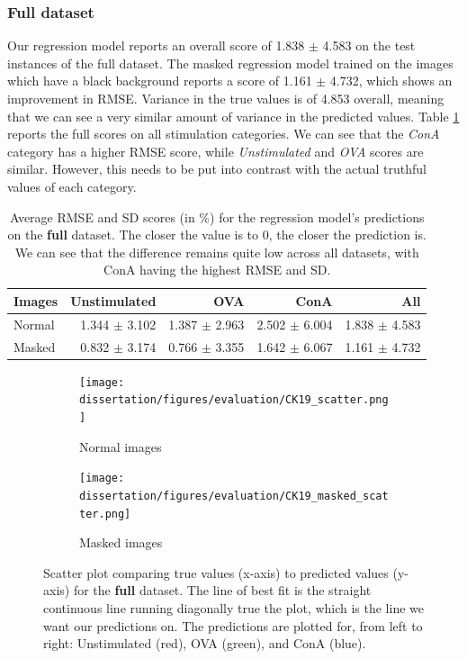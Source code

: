 \bigskip
\subsubsection{Full dataset}
\hfill
\hfill

Our regression model reports an overall score of 1.838 $\pm$ 4.583 on the test instances of the full dataset. The masked regression model trained on the images which have a black background reports a score of 1.161 $\pm$ 4.732, which shows an improvement in RMSE. Variance in the true values is of 4.853 overall, meaning that we can see a very similar amount of variance in the predicted values. Table \ref{tab:full_rmse} reports the full scores on all stimulation categories. We can see that the \textit{ConA} category has a higher RMSE score, while \textit{Unstimulated} and \textit{OVA} scores are similar. However, this needs to be put into contrast with the actual truthful values of each category.

\begin{table}[h!]
\centering
\caption{Average RMSE and SD scores (in \%) for the regression model's predictions on the \textbf{full} dataset. The closer the value is to 0, the closer the prediction is. We can see that the difference remains quite low across all datasets, with ConA having the highest RMSE and SD.}
\label{tab:full_rmse}
\begin{tabular}{l|rrr|r}
\rowcolor[HTML]{EFEFEF}
\textbf{Images} & \cellcolor[HTML]{FFCCC9}\textbf{Unstimulated} & \cellcolor[HTML]{C9FFCB}\textbf{OVA} & \cellcolor[HTML]{96FFFB}\textbf{ConA} & \textbf{All} \\ \hline
Normal      & 1.344 $\pm$ 3.102  & 1.387 $\pm$ 2.963   & 2.502 $\pm$ 6.004  &   1.838 $\pm$ 4.583  \\ \hline
Masked      &    0.832 $\pm$ 3.174          & 0.766 $\pm$ 3.355  &  1.642 $\pm$ 6.067   &   1.161 $\pm$ 4.732
\end{tabular}
\end{table}

\begin{figure}[h!]
    \centering
    \begin{subfigure}{.8\textwidth}
        \texttt{[image: dissertation/figures/evaluation/CK19\_scatter.png]}
        \caption{Normal images}
    \end{subfigure}
    \begin{subfigure}{.8\textwidth}
        \texttt{[image: dissertation/figures/evaluation/CK19\_masked\_scatter.png]}
        \caption{Masked images}
        \label{fig:full_masked_scatter}
    \end{subfigure}
    \caption{Scatter plot comparing true values (x-axis) to predicted values (y-axis) for the \textbf{full} dataset. The line of best fit is the straight continuous line running diagonally true the plot, which is the line we want our predictions on. The predictions are plotted for, from left to right: Unstimulated (red), OVA (green), and ConA (blue).}
    \label{fig:full_scatter}
\end{figure}


